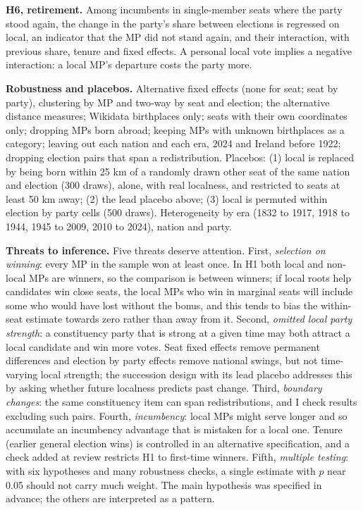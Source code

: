 \documentclass[11pt,a4paper]{article}
\begin{document}
\textbf{H6, retirement.} Among incumbents in single-member seats where the party stood again, the change in the party's share between elections is regressed on local, an indicator that the MP did not stand again, and their interaction, with previous share, tenure and fixed effects. A personal local vote implies a negative interaction: a local MP's departure costs the party more.

\textbf{Robustness and placebos.} Alternative fixed effects (none for seat; seat by party), clustering by MP and two-way by seat and election; the alternative distance measures; Wikidata birthplaces only; seats with their own coordinates only; dropping MPs born abroad; keeping MPs with unknown birthplaces as a category; leaving out each nation and each era, 2024 and Ireland before 1922; dropping election pairs that span a redistribution. Placebos: (1) local is replaced by being born within 25 km of a randomly drawn other seat of the same nation and election (300 draws), alone, with real localness, and restricted to seats at least 50 km away; (2) the lead placebo above; (3) local is permuted within election by party cells (500 draws). Heterogeneity by era (1832 to 1917, 1918 to 1944, 1945 to 2009, 2010 to 2024), nation and party.

\textbf{Threats to inference.} Five threats deserve attention. First, \emph{selection on winning}: every MP in the sample won at least once. In H1 both local and non-local MPs are winners, so the comparison is between winners; if local roots help candidates win close seats, the local MPs who win in marginal seats will include some who would have lost without the bonus, and this tends to bias the within-seat estimate towards zero rather than away from it. Second, \emph{omitted local party strength}: a constituency party that is strong at a given time may both attract a local candidate and win more votes. Seat fixed effects remove permanent differences and election by party effects remove national swings, but not time-varying local strength; the succession design with its lead placebo addresses this by asking whether future localness predicts past change. Third, \emph{boundary changes}: the same constituency item can span redistributions, and I check results excluding such pairs. Fourth, \emph{incumbency}: local MPs might serve longer and so accumulate an incumbency advantage that is mistaken for a local one. Tenure (earlier general election wins) is controlled in an alternative specification, and a check added at review restricts H1 to first-time winners. Fifth, \emph{multiple testing}: with six hypotheses and many robustness checks, a single estimate with $p$ near 0.05 should not carry much weight. The main hypothesis was specified in advance; the others are interpreted as a pattern.
\end{document}
